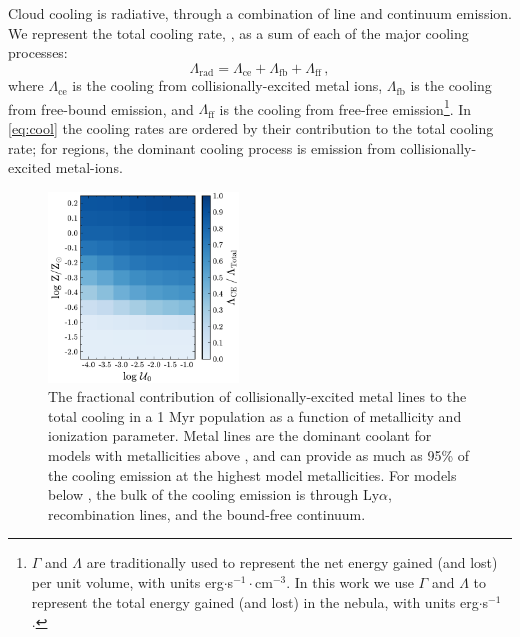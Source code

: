 Cloud cooling is radiative, through a combination of line and continuum emission. We represent the total cooling rate, \Cool{}, as a sum of each of the major cooling processes:
\begin{equation}\label{eq:cool}
    \Lambda_{\mathrm{rad}} = \Lambda_{\mathrm{ce}} + \Lambda_{\mathrm{fb}} + \Lambda_{\mathrm{ff}} \, ,
\end{equation}
where $\Lambda_{\mathrm{ce}}$ is the cooling from collisionally-excited metal ions, $\Lambda_{\mathrm{fb}}$ is the cooling from free-bound emission, and $\Lambda_{\mathrm{ff}}$ is the cooling from free-free emission\footnote{$\Gamma$ and $\Lambda$ are traditionally used to represent the net energy gained (and lost) per unit volume, with units erg$\cdot$s$^{-1}\cdot$cm$^{-3}$. In this work we use $\Gamma$ and $\Lambda$ to represent the total energy gained (and lost) in the nebula, with units erg$\cdot$s$^{-1}$.}. In \ref{eq:cool} the cooling rates are ordered by their contribution to the total cooling rate; for \hii regions, the dominant cooling process is emission from collisionally-excited metal-ions.

\begin{figure}[!htbp]
  \begin{centering}
    \includegraphics[width=0.45\textwidth]{manuscript/chapter2/f5.pdf}
    \caption{The fractional contribution of collisionally-excited metal lines to the total cooling in a 1 Myr population as a function of metallicity and ionization parameter. Metal lines are the dominant coolant for models with metallicities above , and can provide as much as 95\% of the cooling emission at the highest model metallicities. For models below , the bulk of the cooling emission is through Ly$\alpha$, recombination lines, and the bound-free continuum.}
    \label{fig:cooling}
  \end{centering}
\end{figure}

